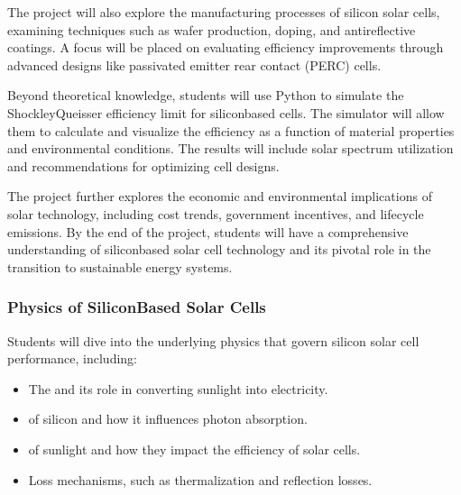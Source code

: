 \documentclass[letterpaper,10pt,english]{jupyterBook}
\begin{document}
\sphinxAtStartPar
The project will also explore the manufacturing processes of silicon
solar cells, examining techniques such as wafer production, doping, and
anti\sphinxhyphen{}reflective coatings. A focus will be placed on evaluating
efficiency improvements through advanced designs like passivated emitter
rear contact (PERC) cells.

\sphinxAtStartPar
Beyond theoretical knowledge, students will use Python to simulate the
Shockley\sphinxhyphen{}Queisser efficiency limit for silicon\sphinxhyphen{}based cells. The
simulator will allow them to calculate and visualize the efficiency as a
function of material properties and environmental conditions. The
results will include solar spectrum utilization and recommendations for
optimizing cell designs.

\sphinxAtStartPar
The project further explores the economic and environmental implications
of solar technology, including cost trends, government incentives, and
lifecycle emissions. By the end of the project, students will have a
comprehensive understanding of silicon\sphinxhyphen{}based solar cell technology and
its pivotal role in the transition to sustainable energy systems.


\subsubsection{Physics of Silicon\sphinxhyphen{}Based Solar Cells}
\label{\detokenize{ProjectInstructions:physics-of-silicon-based-solar-cells}}
\sphinxAtStartPar
Students will dive into the underlying physics that govern silicon solar
cell performance, including:
\begin{itemize}
\item {} 
\sphinxAtStartPar
The  and its role in converting sunlight
into electricity.

\item {} 
\sphinxAtStartPar
{} of silicon and how it influences photon
absorption.

\item {} 
\sphinxAtStartPar
{} of sunlight and how they impact the
efficiency of solar cells.

\item {} 
\sphinxAtStartPar
Loss mechanisms, such as thermalization and reflection losses.

\end{itemize}
\end{document}
